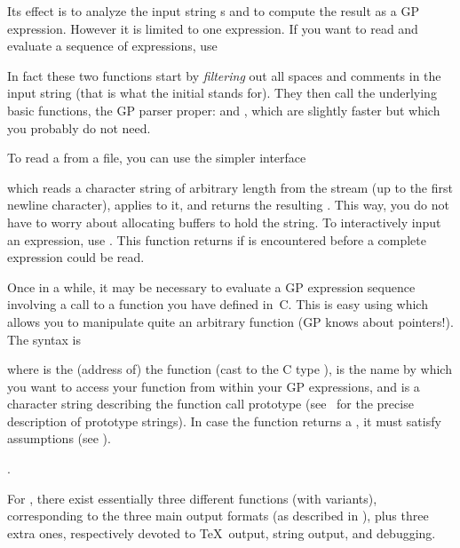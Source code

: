 
\noindent
Its effect is to analyze the input string s and to compute the result as a
GP expression. However it is limited to one expression. If you want to read
and evaluate a sequence of expressions, use


\noindent{}
In fact these two functions start by \emph{filtering} out all spaces and
comments in the input string (that is what the initial  stands for).
They then call the underlying basic functions, the GP parser proper:
 and , which are
slightly faster but which you probably do not need.

To read a  from a file, you can use the simpler interface


which reads a character string of arbitrary length from the stream 
(up to the first newline character), applies  to it, and
returns the resulting . This way, you do not have to worry about
allocating buffers to hold the string. To interactively input an expression,
use . This function returns  if  is
encountered before a complete expression could be read.

Once in a while, it may be necessary to evaluate a GP expression sequence
involving a call to a function you have defined in~C. This is easy using
 which allows you to manipulate quite an arbitrary function (GP
knows about pointers!). The syntax is


\noindent where  is the (address of) the function (cast to the C type
),  is the name by which you want to access your
function from within your GP expressions, and  is a character
string describing the function call prototype (see~
for the precise description of prototype strings). In case the function
returns a , it must satisfy  assumptions (see
).

.

\noindent
For , there exist essentially three different functions (with
variants), corresponding to the three main  output formats (as described in
), plus three extra ones, respectively devoted to
\TeX\ output, string output, and debugging.

